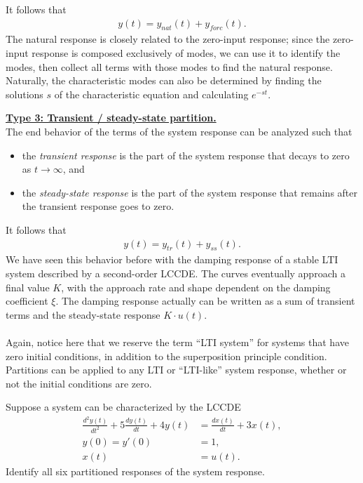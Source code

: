 \documentclass{report}
\begin{document}
\noindent It follows that 
\begin{align}
    y(t) = y_{nat}(t) + y_{forc}(t).
\end{align}
The natural response is closely related to the zero-input response; since the zero-input response is composed exclusively of modes, we can use it to identify the modes, 
then collect all terms with those modes to find the natural response. Naturally, the characteristic modes can also be determined by finding the solutions $s$ of the characteristic equation 
and calculating $e^{-st}$.
\begin{tcolorbox}[width=\textwidth,colback={white}, sharp corners]
    \textbf{\underline{Type 3: Transient / steady-state partition.}} \\[0.25cm]
    The end behavior of the terms of the system response can be analyzed such that
    \begin{itemize}
        \item the \emph{transient response} is the part of the system response that decays to zero as $t\to\infty$, and
        \item the \emph{steady-state response} is the part of the system response that remains after the transient response goes to zero.
    \end{itemize}
\end{tcolorbox}
\noindent It follows that 
\begin{align}
    y(t) = y_{tr}(t) + y_{ss}(t).
\end{align}
We have seen this behavior before with the damping response of a stable LTI system described by a second-order LCCDE. The curves eventually approach a final value $K$, with 
the approach rate and shape dependent on the damping coefficient $\xi$. The damping response actually can be written as a sum of transient terms and the steady-state response $K\cdot u(t)$.
\\ \\
Again, notice here that we reserve the term ``LTI system'' for systems that have zero initial conditions, in addition to the superposition principle condition. Partitions can be applied to any LTI or ``LTI-like'' system response, 
whether or not the initial conditions are zero.
\begin{example}
    Suppose a system can be characterized by the LCCDE 
    \begin{align*}
        \frac{d^2y(t)}{dt^2} + 5\frac{dy(t)}{dt} + 4y(t) &= \frac{dx(t)}{dt} + 3x(t), \\ 
        y(0) = y'(0) &= 1, \\ 
        x(t) &= u(t).
    \end{align*}
    Identify all six partitioned responses of the system response.
\end{example}
\end{document}
